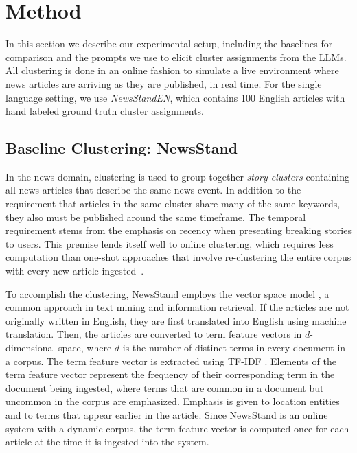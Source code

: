 \section{Method}\label{section:method}

In this section we describe our experimental setup, including the baselines for comparison and the prompts we use to elicit cluster assignments from the LLMs.
All clustering is done in an online fashion to simulate a live environment where news articles are arriving as they are published, in real time.
For the single language setting, we use \emph{NewsStandEN}, which contains 100 English articles with hand labeled ground truth cluster assignments.


\subsection{Baseline Clustering: NewsStand}
In the news domain, clustering is used to group together \emph{story clusters} containing all news articles that describe the same news event. 
In addition to the requirement that articles in the same cluster share many of the same keywords, they also must be published around the same timeframe. 
The temporal requirement stems from the emphasis on recency when presenting breaking stories to users. 
This premise lends itself well to online clustering, which requires less computation than one-shot approaches that involve re-clustering the entire corpus with every new article ingested~\cite{Teit08}.

To accomplish the clustering, NewsStand employs the vector space model \cite{salton}, a common approach in text mining and information retrieval. 
If the articles are not originally written in English, they are first translated into English using machine translation.
Then, the articles are converted to term feature vectors in $d$-dimensional space, where $d$ is the number of distinct terms in every document in a corpus. 
The term feature vector is extracted using TF-IDF \cite{salton-buckley}. 
Elements of the term feature vector represent the frequency of their corresponding term in the document being ingested, where terms that are common in a document but uncommon in the corpus are emphasized. 
Emphasis is given to location entities and to terms that appear earlier in the article. 
Since NewsStand is an online system with a dynamic corpus, the term feature vector is computed once for each article at the time it is ingested into the system.

